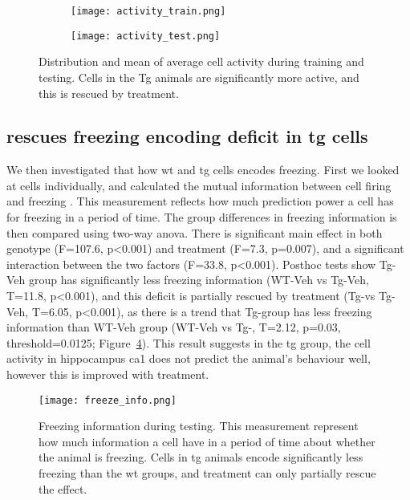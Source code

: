 \begin{figure}[h]
    \begin{subfigure}[h]{\textwidth}
        \texttt{[image: activity\_train.png]}
        \caption{\label{f.ad.acttrain}}
    \end{subfigure}
    \begin{subfigure}[h]{\textwidth}
        \texttt{[image: activity\_test.png]}
        \caption{\label{f.ad.acttest}}
    \end{subfigure}
    \caption{Distribution and mean of average cell activity during  training and  testing. Cells in the Tg animals are significantly more active, and this is rescued by \tglu treatment. \label{f.ad.activity}}
\end{figure}

\subsection{\tglu rescues freezing encoding deficit in \gls{tg} cells}

We then investigated that how \gls{wt} and \gls{tg} cells encodes freezing. First we looked at cells individually, and calculated the mutual information between cell firing and freezing \citep{skaggs93}. This measurement reflects how much prediction power a cell has for freezing in a period of time. The group differences in freezing information is then compared using two-way \gls{anova}. There is significant main effect in both genotype (F=107.6, p<0.001) and treatment (F=7.3, p=0.007), and a significant interaction between the two factors (F=33.8, p<0.001). Posthoc tests show Tg-Veh group has significantly less freezing information (WT-Veh vs Tg-Veh, T=11.8, p<0.001), and this deficit is partially rescued by \tglu treatment (Tg-\tglu vs Tg-Veh, T=6.05, p<0.001), as there is a trend that Tg-\tglu group has less freezing information than WT-Veh group (WT-Veh vs Tg-\tglu, T=2.12, p=0.03, threshold=0.0125; Figure~\ref{f.ad.freeze_info}). This result suggests in the \gls{tg} group, the cell activity in hippocampus \gls{ca1} does not predict the animal's behaviour well, however this is improved with \tglu treatment. 
\begin{figure}[h]
    \texttt{[image: freeze\_info.png]}
    \caption{Freezing information during testing. This measurement represent how much information a cell have in a period of time about whether the animal is freezing. Cells in \gls{tg} animals encode significantly less freezing than the \gls{wt} groups, and \tglu treatment can only partially rescue the effect. \label{f.ad.freeze_info}}
\end{figure}
    


